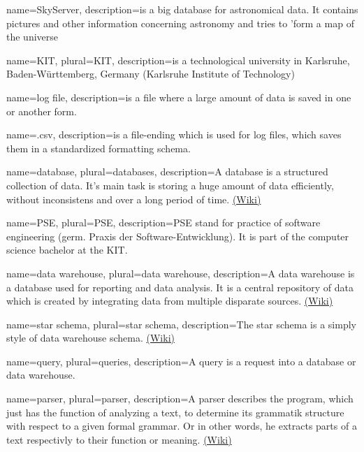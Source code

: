 
{
  name=SkyServer,
  description={is a big database for astronomical data. It contains pictures
              and other information concerning astronomy and tries to 'form a 
              map of the universe
              }
}


{
  name=KIT,
  plural=KIT,
  description={is a technological university in Karlsruhe, Baden-Württemberg, Germany 
              (Karlsruhe Institute of Technology)}
}

{
  name=log file,
  description={is a file where a large amount of data is saved in one or another form.}
}

{
  name=.csv,
  description={is a file-ending which is used for log files, 
  which saves them in a standardized formatting schema.}
}

{
  name=database,
  plural=databases,
  description={A database is a structured collection of data. It's main task is
  storing a huge amount of data efficiently, without inconsistens and over a long period of time.   
  \href{https://en.wikipedia.org/wiki/Database}{(Wiki)}}
}

{
  name=PSE,
  plural=PSE,
  description={PSE stand for practice of software engineering (germ. Praxis der Software-Entwicklung).
  It is part of the computer science bachelor at the \gls{KIT}.}
}

{
  name=data warehouse,
  plural=data warehouse,
  description={A data warehouse is a \gls{database} used for reporting and data analysis.
  It is a central repository of data which is created by integrating data from multiple disparate sources.
  \href{https://en.wikipedia.org/wiki/Data_warehouse}{(Wiki)}}
}
  
  
{
  name=star schema,
  plural=star schema,
  description={The star schema is a simply style of \gls{data warehouse} schema.
 \href{https://en.wikipedia.org/wiki/Star_schema}{(Wiki)}}
}

  
{
  name=query,
  plural=queries,
  description={A query is a request into a \gls{database} or \gls{data warehouse}.}
}

{
  name=parser,
  plural=parser,
  description={A parser describes the program, which just has the function of analyzing a text, 
  to determine its grammatik structure with respect to a given formal grammar. Or in other words,
  he extracts parts of a text respectivly to their function or meaning. 
  \href{https://en.wikipedia.org/wiki/Parser}{(Wiki)} }
}

